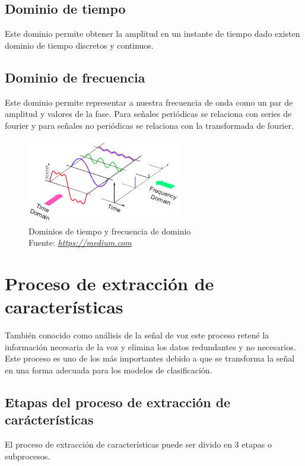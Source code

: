 \subsection{Dominio de tiempo}
Este dominio permite obtener la amplitud en un instante de tiempo dado existen dominio de tiempo discretos y continuos.
\subsection{Dominio de frecuencia}
Este dominio permite representar a nuestra frecuencia de onda como un par de amplitud y valores de la fase. Para señales periódicas se relaciona con series de fourier y para señales no periódicas se relaciona con la transformada de fourier.
\begin{figure}[H]
	\centering
	\includegraphics[width=0.6\textwidth]{Figures/audio_signal.png}
	\caption{Dominios de tiempo y frecuencia de dominio\\ Fuente:  \href{https://medium.com/@venkateshpnk22/how-to-convert-your-speech-voice-to-text-data-1b2686099260}{\textit{https://medium.com}}}
	\label{onda}
\end{figure} 


\section{Proceso de extracción de características}

También conocido como análisis de la señal de voz este proceso retené la información necesaria de la voz y elimina los datos redundantes y no necesarios. Este proceso es uno de los más importantes debido a que se transforma la señal en una forma adecuada para los modelos de clasificación. 
\subsection{Etapas del proceso de extracción de carácterísticas}

El proceso de extracción de características puede ser divido en 3 etapas o subprocesos.
